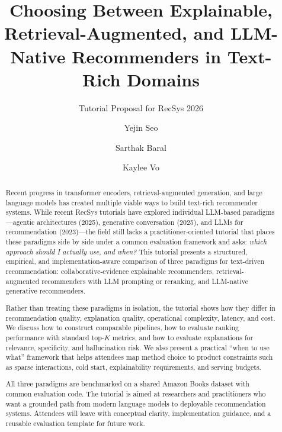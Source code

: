 \documentclass[sigconf,nonacm]{acmart}
\begin{document}
\title{Choosing Between Explainable, Retrieval-Augmented, and LLM-Native Recommenders in Text-Rich Domains}
\subtitle{Tutorial Proposal for RecSys 2026}

\author{Yejin Seo}

\author{Sarthak Baral}

\author{Kaylee Vo}

\begin{abstract}
Recent progress in transformer encoders, retrieval-augmented generation, and large language models has created multiple viable ways to build text-rich recommender systems.
While recent RecSys tutorials have explored individual LLM-based paradigms---agentic architectures (2025), generative conversation (2025), and LLMs for recommendation (2023)---the field still lacks a practitioner-oriented tutorial that places these paradigms side by side under a common evaluation framework and asks: \emph{which approach should I actually use, and when?}
This tutorial presents a structured, empirical, and implementation-aware comparison of three paradigms for text-driven recommendation:
collaborative-evidence explainable recommenders, retrieval-augmented recommenders with LLM prompting or reranking, and LLM-native generative recommenders.

Rather than treating these paradigms in isolation, the tutorial shows how they differ in recommendation quality, explanation quality, operational complexity, latency, and cost.
We discuss how to construct comparable pipelines, how to evaluate ranking performance with standard top-$K$ metrics, and how to evaluate explanations for relevance, specificity, and hallucination risk.
We also present a practical ``when to use what'' framework that helps attendees map method choice to product constraints such as sparse interactions, cold start, explainability requirements, and serving budgets.

All three paradigms are benchmarked on a shared Amazon Books dataset with common evaluation code.
The tutorial is aimed at researchers and practitioners who want a grounded path from modern language models to deployable recommendation systems.
Attendees will leave with conceptual clarity, implementation guidance, and a reusable evaluation template for future work.
\end{abstract}
\end{document}
